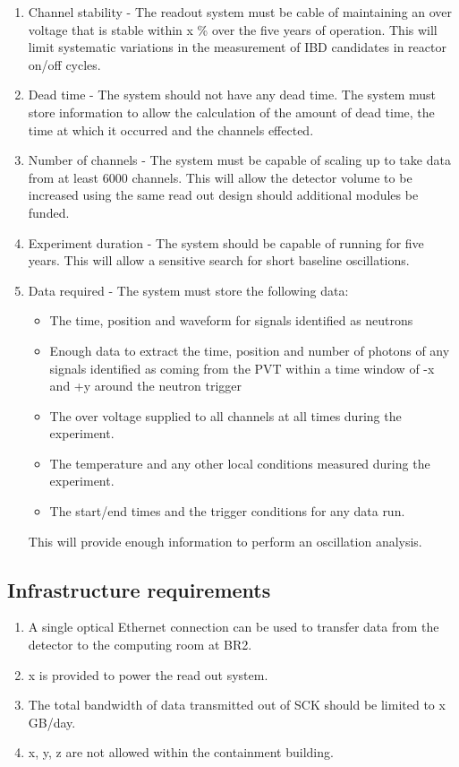 \documentclass[a4paper]{article}
\begin{document}
\begin{enumerate}
\item Channel stability - The readout system must be cable of maintaining an over voltage that is stable within x \% over the five years of operation. 
    This will limit systematic variations in the measurement of IBD candidates in reactor on/off cycles.
\item Dead time - The system should not have any dead time. The system must store information to allow the calculation of the amount of dead time, the time at which it occurred and the channels effected.
\item Number of channels - The system must be capable of scaling up to take data from at least 6000 channels. 
    This will allow the detector volume to be increased using the same read out design should additional modules be funded.  
\item Experiment duration - The system should be capable of running for five years. 
    This will allow a sensitive search for short baseline oscillations.
\item Data required - The system must store the following data: 
    \begin{itemize}
    \item The time, position and waveform for signals identified as neutrons
    \item Enough data to extract the time, position and number of photons of any signals identified as coming from the PVT within a time window of -x and +y around the neutron trigger
    \item The over voltage supplied to all channels at all times during the experiment.
    \item The temperature and any other local conditions measured during the experiment.
    \item The start/end times and the trigger conditions for any data run.   
    \end{itemize}
    This will provide enough information to perform an oscillation analysis.
\end{enumerate}

\subsection{Infrastructure requirements}

\begin{enumerate}
\item A single optical Ethernet connection can be used to transfer data from the detector to the computing room at BR2.
\item x is provided to power the read out system.
\item The total bandwidth of data transmitted out of SCK should be limited to x GB/day.
\item x, y, z are not allowed within the containment building.
\end{enumerate}
\end{document}
